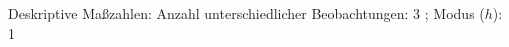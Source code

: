 				\label{tableValues:adem13}
				\vspace*{-\baselineskip}
                    \begin{noten}
                	    \note{} Deskriptive Maßzahlen:
                	    Anzahl unterschiedlicher Beobachtungen: 3%
                	    ; 
                	      Modus ($h$): 1
                     \end{noten}


